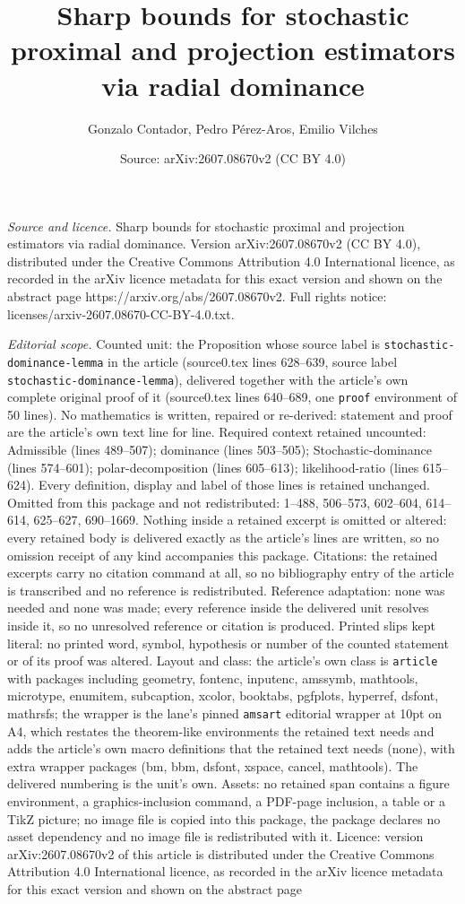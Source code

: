 \documentclass[10pt,a4paper]{amsart}
\title[Sharp bounds for stochastic proximal and projection estimato]{Sharp bounds for stochastic proximal and projection estimators via radial dominance}
\author{Gonzalo Contador, Pedro P\'erez-Aros, Emilio Vilches}
\date{Source: arXiv:2607.08670v2 (CC BY 4.0)}
\begin{document}
\maketitle

\noindent\emph{Source and licence.} Sharp bounds for stochastic proximal and projection estimators via radial dominance. Version arXiv:2607.08670v2 (CC BY 4.0), distributed under the Creative Commons Attribution 4.0 International licence, as recorded in the arXiv licence metadata for this exact version and shown on the abstract page https://arxiv.org/abs/2607.08670v2. Full rights notice: licenses/arxiv-2607.08670-CC-BY-4.0.txt.\par\smallskip

\noindent\textit{Editorial scope.} Counted unit: the Proposition whose source label is \texttt{stochastic-dominance-lemma} in the article (source0.tex lines 628--639, source label \texttt{stochastic-dominance-lemma}), delivered together with the article's own complete original proof of it (source0.tex lines 640--689, one \texttt{proof} environment of 50 lines). No mathematics is written, repaired or re-derived: statement and proof are the article's own text line for line. Required context retained uncounted: Admissible (lines 489--507); dominance (lines 503--505); Stochastic-dominance (lines 574--601); polar-decomposition (lines 605--613); likelihood-ratio (lines 615--624). Every definition, display and label of those lines is retained unchanged. Omitted from this package and not redistributed: 1--488, 506--573, 602--604, 614--614, 625--627, 690--1669. Nothing inside a retained excerpt is omitted or altered: every retained body is delivered exactly as the article's lines are written, so no omission receipt of any kind accompanies this package. Citations: the retained excerpts carry no citation command at all, so no bibliography entry of the article is transcribed and no reference is redistributed. Reference adaptation: none was needed and none was made; every reference inside the delivered unit resolves inside it, so no unresolved reference or citation is produced. Printed slips kept literal: no printed word, symbol, hypothesis or number of the counted statement or of its proof was altered. Layout and class: the article's own class is \texttt{article} with packages including geometry, fontenc, inputenc, amssymb, mathtools, microtype, enumitem, subcaption, xcolor, booktabs, pgfplots, hyperref, dsfont, mathrsfs; the wrapper is the lane's pinned \texttt{amsart} editorial wrapper at 10pt on A4, which restates the theorem-like environments the retained text needs and adds the article's own macro definitions that the retained text needs (none), with extra wrapper packages (bm, bbm, dsfont, xspace, cancel, mathtools). The delivered numbering is the unit's own. Assets: no retained span contains a figure environment, a graphics-inclusion command, a PDF-page inclusion, a table or a TikZ picture; no image file is copied into this package, the package declares no asset dependency and no image file is redistributed with it. Licence: version arXiv:2607.08670v2 of this article is distributed under the Creative Commons Attribution 4.0 International licence, as recorded in the arXiv licence metadata for this exact version and shown on the abstract page 
\end{document}
